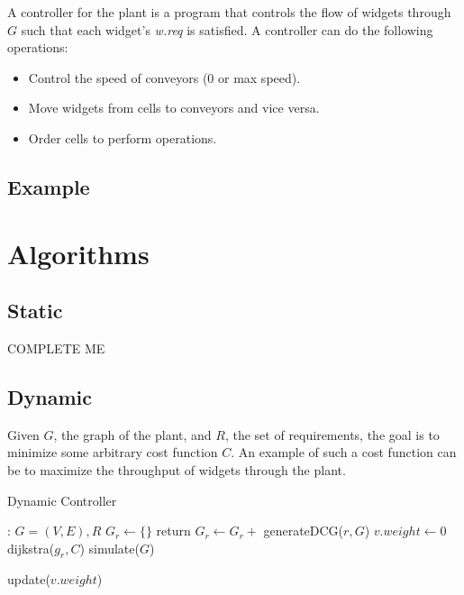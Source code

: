 \documentclass[9pt,conference, compsocconf]{IEEEtran}
\begin{document}
	A controller for the plant is a program that controls the flow of widgets through $G$ such that each widget's \emph{w.req} is satisfied. A controller can do the following operations:
	\begin{itemize}
		\item Control the speed of conveyors (0 or max speed).
		\item Move widgets from cells to conveyors and vice versa.
		\item Order cells to perform operations.
	\end{itemize}

	\subsection{Example}
		

\section{Algorithms}

	\subsection{Static}
		COMPLETE ME
		
	\subsection{Dynamic}
		Given $G$, the graph of the plant, and $R$, the set of requirements, the goal is to minimize some arbitrary cost function $C$. An example of such a cost function can be to maximize the throughput of widgets through the plant.
		
		\begin{algorithm}[H]
			\caption{Dynamic Controller}
			\begin{algorithmic}
				\STATE \Input: $G = (V, E), R$
				\STATE $G_r \gets \{\}$
						\STATE return
					\ENDIF
					\STATE $G_r \gets G_r +$ generateDCG($r, G$)
				\ENDFOR
				\STATE %
					\STATE $v.weight \gets 0$
				\ENDFOR
				\STATE %
						\STATE dijkstra($g_r, C$)
					\ENDFOR
						\STATE simulate($G$)
					\ENDWHILE
					
						\STATE update($v.weight$)
					\ENDFOR
				\ENDWHILE
			\end{algorithmic}
		\end{algorithm}
	
\end{document}
